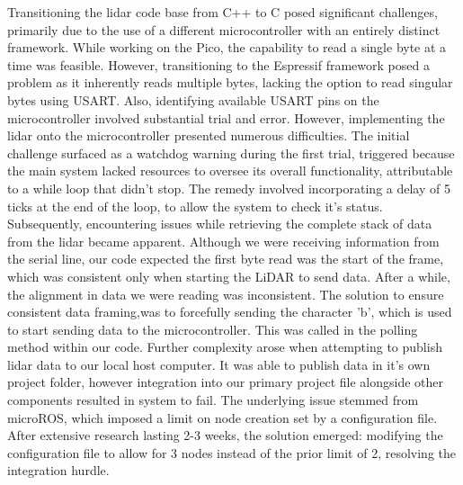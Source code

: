 \documentclass[conference]{IEEEtran}
\begin{document}
Transitioning the lidar code base from C++ to C posed significant challenges, primarily due to the use of a different microcontroller with an entirely distinct framework. While working on the Pico, the capability to read a single byte at a time was feasible. However, transitioning to the Espressif framework posed a problem as it inherently reads multiple bytes, lacking the option to read singular bytes using USART. Also, identifying available USART pins on the microcontroller involved substantial trial and error.
However, implementing the lidar onto the microcontroller presented numerous difficulties. The initial challenge surfaced as a watchdog warning during the first trial, triggered because the main system lacked resources to oversee its overall functionality, attributable to a while loop that didn't stop. The remedy involved incorporating a delay of 5 ticks at the end of the loop, to allow the system to check it’s status.
Subsequently, encountering issues while retrieving the complete stack of data from the lidar became apparent. Although we were receiving information from the serial line, our code expected the first byte read was the start of the frame, which was consistent only when starting the LiDAR to send data. After a while, the alignment in data we were reading was inconsistent. The solution to ensure consistent data framing,was to forcefully sending the character 'b', which is used to start sending data to the microcontroller. This was called in the polling method within our code.
Further complexity arose when attempting to publish lidar data to our local host computer. It was able to publish data in it’s own project folder, however integration into our primary project file alongside other components resulted in system to fail. The underlying issue stemmed from microROS, which imposed a limit on node creation set by a configuration file. After extensive research lasting 2-3 weeks, the solution emerged: modifying the configuration file to allow for 3 nodes instead of the prior limit of 2, resolving the integration hurdle.
\end{document}
